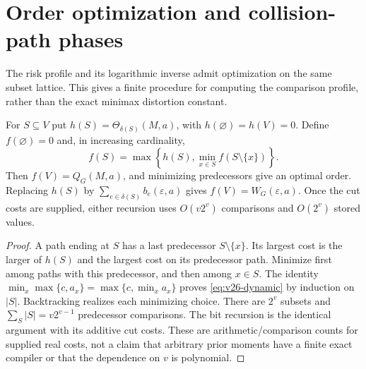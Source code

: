 \section{Order optimization and collision-path phases}
\label{sec:v26-phases}
The risk profile and its logarithmic inverse admit optimization on the
same subset lattice. This gives a finite procedure for computing the
comparison profile, rather than the exact minimax distortion constant.

\begin{proposition}\label{prop:v26-dynamic}
For $S\subseteq V$ put $h(S)=\Theta_{\delta(S)}(M,a)$, with
$h(\varnothing)=h(V)=0$. Define $f(\varnothing)=0$ and, in increasing
cardinality,
\begin{equation}\label{eq:v26-dynamic}
 f(S)=\max\left\{h(S),\min_{x\in S}f(S\setminus\{x\})\right\}.
\end{equation}
Then $f(V)=Q_G(M,a)$, and minimizing predecessors give an optimal order.
Replacing $h(S)$ by $\sum_{e\in\delta(S)}b_e(\varepsilon,a)$ gives
$f(V)=W_G(\varepsilon,a)$. Once the cut costs are supplied, either
recursion uses $O(v2^v)$ comparisons and $O(2^v)$ stored values.
\end{proposition}
\begin{proof}
A path ending at $S$ has a last predecessor $S\setminus\{x\}$.
Its largest cost is the larger of $h(S)$ and the largest cost on its
predecessor path. Minimize first among paths with this predecessor,
and then among $x\in S$. The identity
$\min_x\max\{c,a_x\}=\max\{c,\min_xa_x\}$ proves
\eqref{eq:v26-dynamic} by induction on $|S|$. Backtracking realizes
each minimizing choice. There are $2^v$ subsets and
$\sum_S|S|=v2^{v-1}$ predecessor comparisons. The bit recursion is
the identical argument with its additive cut costs. These are
arithmetic/comparison counts for supplied real costs, not a claim
that arbitrary prior moments have a finite exact compiler or that
the dependence on $v$ is polynomial.
\end{proof}

